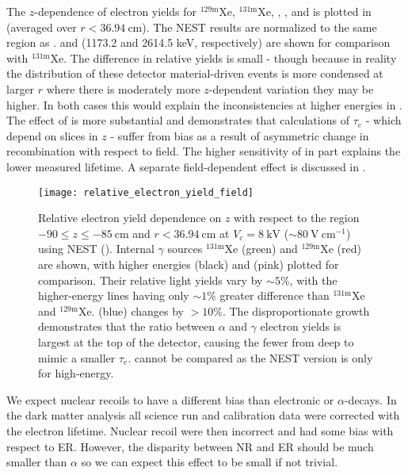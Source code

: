 The $z$-dependence of electron yields for $\mathrm{^{129m}Xe}$, $\mathrm{^{131m}Xe}$, , , and  is
plotted in  (averaged over $r < 36.94\ \mathrm{cm}$).  The NEST results are
normalized to the same region as .   and  (1173.2 and
2614.5 keV, respectively) are shown for comparison with $\mathrm{^{131m}Xe}$.  The difference in relative yields is
small - though because in reality the distribution of these detector material-driven events is more condensed at larger $r$ where there
is moderately more $z$-dependent variation they may be higher.  In both cases this
would explain the inconsistencies at higher energies in .  The
effect of  is more substantial and demonstrates that calculations of $\tau_e$ - which depend on slices in $z$ - suffer from
bias as a result of asymmetric change in recombination with respect to field.  The higher sensitivity of \alphadecays in part explains
the lower measured lifetime.  A separate field-dependent effect is discussed in .

\begin{figure}
\centering
\texttt{[image: relative\_electron\_yield\_field]}
\caption{Relative electron yield dependence on $z$ with respect to the region $-90 \leq z \leq -85\ \mathrm{cm}$ and
$r < 36.94\ \mathrm{cm}$ at $V_c = 8\ \mathrm{kV}$ (${\sim}80\ \mathrm{V\ cm^{-1}}$) using NEST ().  Internal
$\gamma$ sources $\mathrm{^{131m}Xe}$ (green) and
$\mathrm{^{129m}Xe}$
(red) are shown, with higher energies  (black) and  (pink) plotted for comparison. Their relative
light yields vary by ${\sim} 5\%$, with the higher-energy lines having only ${\sim} 1\%$ greater difference than $\mathrm{^{131m}Xe}$ and
$\mathrm{^{129m}Xe}$.   (blue) changes by $> 10\%$.  The disproportionate growth demonstrates that the ratio between
$\alpha$ and $\gamma$ electron yields is largest at the top of the detector, causing the fewer \electron from deep \alphadecays to
mimic a smaller $\tau_e$.  \metakr cannot be compared as the NEST version is only for high-energy.}
\label{fig:electron_lifetimes_rn222_vs_kr83m_field_z}
\end{figure}

We expect nuclear recoils to have a different bias than electronic or $\alpha$-decays.  In the dark matter analysis all
science run and calibration data were corrected with the \metakr electron lifetime.  Nuclear recoil \cstwob were then incorrect and had
some bias with respect to ER.  However, the disparity between NR and ER should be much smaller than $\alpha$ so we can expect this effect
to be small if not trivial.



